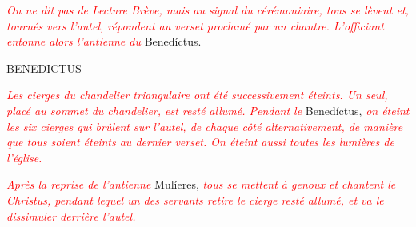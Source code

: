 \documentclass[11pt,a4paper,twoside]{article} %
\begin{document}

\nopagebreak
{}
\nopagebreak
{}
\nopagebreak






\textcolor{red}{\itshape On ne dit pas de Lecture Brève, mais au signal du
cérémoniaire, tous se lèvent et, tournés vers l’autel, répondent au verset
proclamé par un chantre. L’officiant entonne alors l’antienne du} Benedíctus.

\nopagebreak
{}
\nopagebreak



\nopagebreak
{}
\nopagebreak


\begin{center}
\uppercase{\Large{Benedictus}}
\end{center}
\nopagebreak
{}
\nopagebreak

\nopagebreak


\textcolor{red}{\itshape Les cierges du chandelier triangulaire ont été
successivement éteints. Un seul, placé au sommet du chandelier, est resté allumé.
Pendant le} Benedíctus, \textcolor{red}{\itshape on éteint les six cierges qui
brûlent sur l’autel, de chaque côté alternativement, de manière que tous soient
éteints au dernier verset. On éteint aussi toutes les lumières de l’église.}

\textcolor{red}{\itshape Après la reprise de l’antienne} Mulíeres, %
\textcolor{red}{\itshape tous se mettent à genoux et chantent le Christus, %
pendant lequel un des servants retire le cierge resté allumé, et va le dissimuler
derrière l’autel.}

\nopagebreak
{}
\nopagebreak

\end{document}
